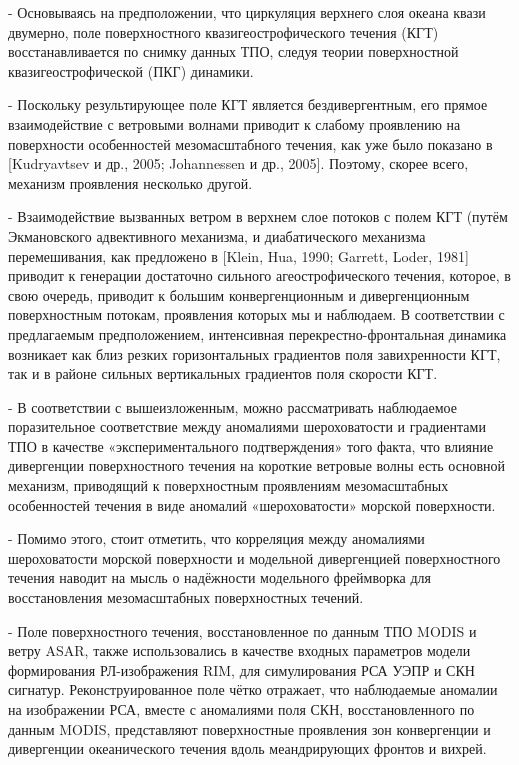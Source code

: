 - Основываясь на предположении, что циркуляция верхнего слоя океана квази двумерно, поле поверхностного квазигеострофического течения (КГТ) восстанавливается по снимку данных ТПО, следуя теории поверхностной квазигеострофической (ПКГ) динамики. 

- Поскольку результирующее поле КГТ является бездивергентным, его прямое взаимодействие с ветровыми волнами приводит к слабому проявлению на поверхности особенностей мезомасштабного течения, как уже было показано в [Kudryavtsev и др., 2005; Johannessen и др., 2005]. Поэтому, скорее всего, механизм проявления несколько другой. 

- Взаимодействие вызванных ветром в верхнем слое потоков с полем КГТ (путём Экмановского адвективного механизма, и диабатического механизма перемешивания, как предложено в [Klein, Hua, 1990; Garrett, Loder, 1981] приводит к генерации достаточно сильного агеострофического течения, которое, в свою очередь, приводит к большим конвергенционным и дивергенционным поверхностным потокам, проявления которых мы и наблюдаем. В соответствии с предлагаемым предположением, интенсивная перекрестно-фронтальная динамика возникает как близ резких горизонтальных градиентов поля завихренности КГТ, так и в районе сильных вертикальных градиентов поля скорости КГТ.

- В соответствии с вышеизложенным, можно рассматривать наблюдаемое поразительное соответствие между аномалиями шероховатости и градиентами ТПО в качестве «экспериментального подтверждения» того факта, что влияние дивергенции поверхностного течения на короткие ветровые волны есть основной механизм, приводящий к поверхностным проявлениям мезомасштабных особенностей течения в виде аномалий «шероховатости» морской поверхности. 

- Помимо этого, стоит отметить, что корреляция между аномалиями шероховатости морской поверхности и модельной дивергенцией поверхностного течения наводит на мысль о надёжности модельного фреймворка для восстановления мезомасштабных поверхностных течений.

- Поле поверхностного течения, восстановленное по данным ТПО MODIS и ветру ASAR, также использовались в качестве входных параметров модели формирования РЛ-изображения RIM, для симулирования РСА УЭПР и СКН сигнатур. Реконструированное поле чётко отражает, что наблюдаемые аномалии на изображении РСА, вместе с аномалиями поля СКН, восстановленного по данным MODIS, представляют поверхностные проявления зон конвергенции и дивергенции океанического течения вдоль меандрирующих фронтов и вихрей.



